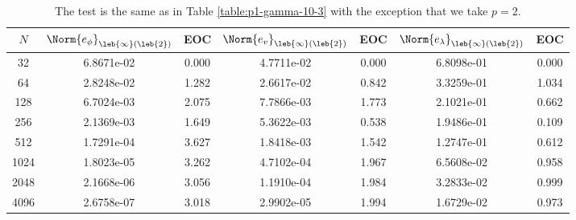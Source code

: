 \documentclass[final]{amsart}
\numberwithin{equation}{section}
\begin{document}
\begin{table}
  \caption{\label{table:p2-gamma-10-3} The test is the same as in
    Table \ref{table:p1-gamma-10-3} with the exception that
    we take $p=2$.}
  \begin{center}
    
\begin{tabular}{c|c|c|c|c|c|c}
$N$ & $\Norm{e_\phi}_{\leb{\infty}(\leb{2})}$ & EOC & $\Norm{e_v}_{\leb{\infty}(\leb{2})}$ & EOC & $\Norm{e_\lambda}_{\leb{\infty}(\leb{2})}$ & EOC \\
\hline
32 & 6.8671e-02 & 0.000 & 4.7711e-02 & 0.000 & 6.8098e-01 & 0.000 \\
64 & 2.8248e-02 & 1.282 & 2.6617e-02 & 0.842 & 3.3259e-01 & 1.034 \\
128 & 6.7024e-03 & 2.075 & 7.7866e-03 & 1.773 & 2.1021e-01 & 0.662 \\
256 & 2.1369e-03 & 1.649 & 5.3622e-03 & 0.538 & 1.9486e-01 & 0.109 \\
512 & 1.7291e-04 & 3.627 & 1.8418e-03 & 1.542 & 1.2747e-01 & 0.612 \\
1024 & 1.8023e-05 & 3.262 & 4.7102e-04 & 1.967 & 6.5608e-02 & 0.958 \\
2048 & 2.1668e-06 & 3.056 & 1.1910e-04 & 1.984 & 3.2833e-02 & 0.999 \\
4096 & 2.6758e-07 & 3.018 & 2.9902e-05 & 1.994 & 1.6729e-02 & 0.973 \\
\end{tabular}

  \end{center}
\end{table}
\end{document}
